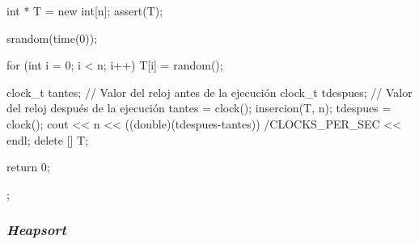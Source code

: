 \documentclass[12pt,spanish]{article}
\begin{document}
\begin{multicols}{2}
\begin{tcblisting}
{  int * T = new int[n];
  assert(T);

  srandom(time(0));

  for (int i = 0; i < n; i++)
      T[i] = random();

  clock_t tantes;    // Valor del reloj antes de la ejecución
  clock_t tdespues;  // Valor del reloj después de la ejecución
  tantes = clock();
  insercion(T, n);
  tdespues = clock();
  cout << n << ((double)(tdespues-tantes))
  /CLOCKS_PER_SEC << endl;
  delete [] T;

  return 0;
};
\end{tcblisting}
\end{multicols}
\newpage
\subsubsection{\textit{Heapsort}}
\end{document}
